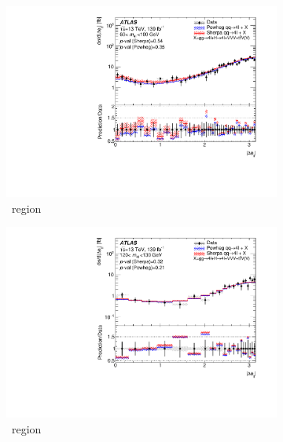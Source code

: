 \begin{figure}[htb!]
    \begin{subfigure}{.49\textwidth}\centering
      \includegraphics[width=.99\linewidth]{Figures/m4l/UnfoldedResults/Unfolded_Data_deltaPhiLeadingLeptons_m4l60-100.pdf}\caption{\ZFourL \ region}\label{fig:sub-first}
    \end{subfigure}
    \begin{subfigure}{.49\textwidth}\centering
      \includegraphics[width=.99\linewidth]{Figures/m4l/UnfoldedResults/Unfolded_Data_deltaPhiLeadingLeptons_m4l120-130.pdf} \caption{\HFourL \ region}\label{fig:sub-second}
    \end{subfigure}
    \begin{subfigure}{.49\textwidth}\centering

\end{subfigure}
\end{figure}
